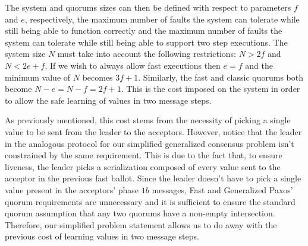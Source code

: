 The system and quorums sizes can then be defined with respect to parameters $f$ and $e$, respectively, the maximum number of faults the system can tolerate while still being able to function correctly and the maximum number of faults the system can tolerate while still being able to support two step executions. The system size $N$ must take into account the following restrictions: $N > 2f$ and $N < 2e+f$. If we wish to always allow fast executions then $e=f$ and the minimum value of $N$ becomes $3f+1$. Similarly, the fast and classic quorums both become $N-e=N-f= 2f+1$. This is the cost imposed on the system in order to allow the safe learning of values in two message steps. \par
As previously mentioned, this cost stems from the necessity of picking a single value to be sent from the leader to the acceptors. However, notice that the leader in the analogous protocol for our simplified generalized consensus problem isn't constrained by the same requirement. This is due to the fact that, to ensure liveness, the leader picks a serialization composed of every value sent to the acceptor in the previous fast ballot. Since the leader doesn't have to pick a single value present in the acceptors' phase $1b$ messages, Fast and Generalized Paxos' quorum requirements are unnecessary and it is sufficient to ensure the standard quorum assumption that any two quorums have a non-empty intersection. Therefore, our simplified problem statement allows us to do away with the previous cost of learning values in two message steps.
